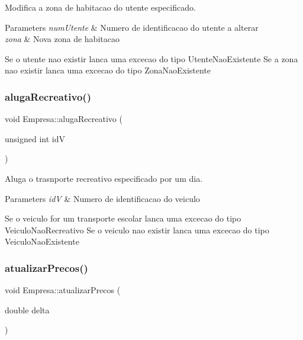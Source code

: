 Modifica a zona de habitacao do utente especificado. 


\begin{DoxyParams}{Parameters}
{\em num\+Utente} & Numero de identificacao do utente a alterar \\
\hline
{\em zona} & Nova zona de habitacao\\
\hline
\end{DoxyParams}
Se o utente nao existir lanca uma excecao do tipo Utente\+Nao\+Existente Se a zona nao existir lanca uma excecao do tipo Zona\+Nao\+Existente \mbox{\label{class_empresa_a07dc1066c3bbe1e1043f3d0f3004645c}} 
\subsubsection{\texorpdfstring{aluga\+Recreativo()}{alugaRecreativo()}}
{\footnotesize\ttfamily void Empresa\+::aluga\+Recreativo (\begin{DoxyParamCaption}\item[{unsigned int}]{idV }\end{DoxyParamCaption})}



Aluga o trasnporte recreativo especificado por um dia. 


\begin{DoxyParams}{Parameters}
{\em idV} & Numero de identificacao do veiculo\\
\hline
\end{DoxyParams}
Se o veiculo for um transporte escolar lanca uma excecao do tipo Veiculo\+Nao\+Recreativo Se o veiculo nao existir lanca uma excecao do tipo Veiculo\+Nao\+Existente \mbox{\label{class_empresa_aa2d2b0e64413e2ddf6c29c82daa5a743}} 
\subsubsection{\texorpdfstring{atualizar\+Precos()}{atualizarPrecos()}}
{\footnotesize\ttfamily void Empresa\+::atualizar\+Precos (\begin{DoxyParamCaption}\item[{double}]{delta }\end{DoxyParamCaption})}



